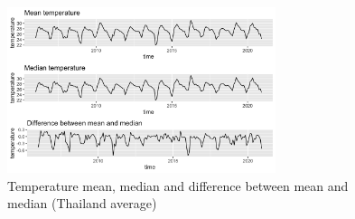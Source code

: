 \documentclass[parskip]{scrartcl}
\begin{document}
\begin{figure}[htbp] 
	\centering
	\includegraphics[width=0.7\textwidth]{fig/mean_median_temp.png}
	\caption{Temperature mean, median and difference between mean and median (Thailand average)}
	\label{fig:mean_median_temp}
\end{figure}


\begin{figure}[htbp] 
	\centering


		
		
	\caption{}
	\label{fig:inc_temp_maps}
\end{figure}
\end{document}
